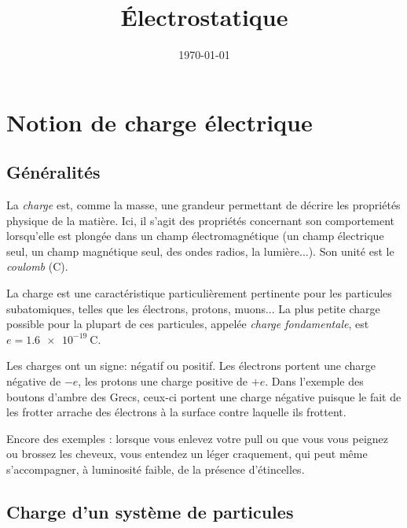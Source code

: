 \documentclass{article}
\title{Électrostatique}
\author{}
\date{\today}
\theoremstyle{definition}
\theoremstyle{remark}
\begin{document}
\maketitle


\section{Notion de charge électrique}

\subsection{Généralités}

La \textit{charge} est, comme la masse, une grandeur permettant de décrire les propriétés physique de la matière. Ici, il s'agit des propriétés concernant son comportement lorsqu'elle est plongée dans un champ électromagnétique (un champ électrique seul, un champ magnétique seul, des ondes radios, la lumière...). Son unité est le \textit{coulomb} (C).

La charge est une caractéristique particulièrement pertinente pour les particules subatomiques, telles que les électrons, protons, muons... La plus petite charge possible pour la plupart de ces particules, appelée \textit{charge fondamentale}, est $e= \SI{1.6e-19}{\coulomb}.$

\vspace{1em}

\vspace{1em}

Les charges ont un signe: négatif ou positif. Les électrons portent une charge négative de $-e$, les protons une charge positive de $+e$. Dans l'exemple des boutons d'ambre des Grecs, ceux-ci portent une charge négative puisque le fait de les frotter arrache des électrons à la surface contre laquelle ils frottent.

Encore des exemples : lorsque vous enlevez votre pull ou que vous vous peignez ou brossez les cheveux, vous entendez un léger craquement, qui peut même s'accompagner, à luminosité faible, de la présence d'étincelles.

\subsection{Charge d'un système de particules}
\end{document}
